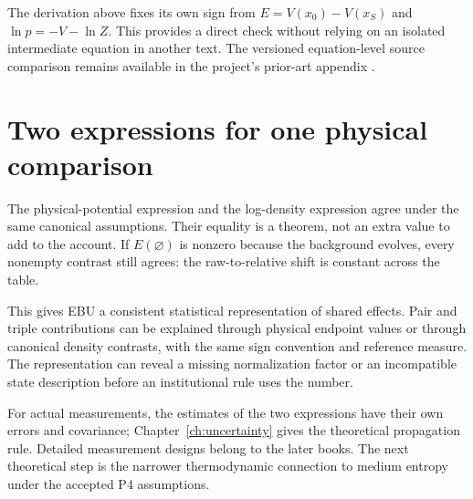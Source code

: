 The derivation above fixes its own sign from $E=V(x_0)-V(x_S)$ and $\ln p=-V-\ln Z$. This provides a direct check without relying on an isolated intermediate equation in another text. The versioned equation-level source comparison remains available in the project's prior-art appendix \cite{smg-prior}.

\section{Two expressions for one physical comparison}
The physical-potential expression and the log-density expression agree under the same canonical assumptions. Their equality is a theorem, not an extra value to add to the account. If $E(\varnothing)$ is nonzero because the background evolves, every nonempty contrast still agrees: the raw-to-relative shift is constant across the table.

This gives EBU a consistent statistical representation of shared effects. Pair and triple contributions can be explained through physical endpoint values or through canonical density contrasts, with the same sign convention and reference measure. The representation can reveal a missing normalization factor or an incompatible state description before an institutional rule uses the number.

For actual measurements, the estimates of the two expressions have their own errors and covariance; Chapter~\ref{ch:uncertainty} gives the theoretical propagation rule. Detailed measurement designs belong to the later books. The next theoretical step is the narrower thermodynamic connection to medium entropy under the accepted P4 assumptions.
